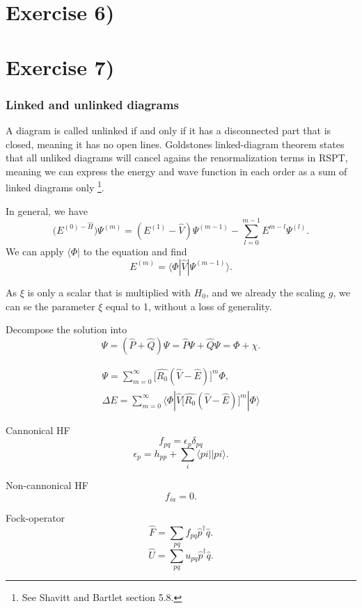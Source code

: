 \documentclass[a4paper, 11pt, notitlepage, english]{article}
\newcommand{\bra}[1]{\langle #1|}
\newcommand{\brakket}[2]{\langle #1 || #2 \rangle}
\newcommand{\op}[1]{\hat{#1}}
\newcommand{\braopket}[3]{\langle #1 | {#2} | #3 \rangle}
\newcommand{\eps}{\epsilon}
\begin{document}
\clearpage

\section*{Exercise 6)}


\clearpage


\section*{Exercise 7)}

\subsubsection*{Linked and unlinked diagrams}

A diagram is called unlinked if and only if it has a disconnected part that is closed, meaning it has no open lines. Goldstones linked-diagram theorem states that all unliked diagrams will cancel agains the renormalization terms in RSPT, meaning we can express the energy and wave function in each order as a sum of linked diagrams only \footnote{See Shavitt and Bartlet section 5.8.}. 

\clearpage

In general, we have
$$\big(E^{(0) - \op{H}}\big) \Psi^{(m)} = (E^{(1)}-\op{V})\Psi^{(m-1)} - \sum_{l=0}^{m-1} E^{m-l}\Psi^{(l)}.$$
We can apply $\bra{\Phi}$ to the equation and find
$$E^{(m)} = \braopket{\Phi}{\op{V}}{\Psi^{(m-1)}}.$$

As $\xi$ is only a scalar that is multiplied with $H_0$, and we already the scaling $g$, we can se the parameter $\xi$ equal to 1, without a loss of generality.

Decompose the solution into
$$\Psi = (\op{P} + \op{Q})\Psi = \op{P}\Psi + \op{Q}\Psi = \Phi + \chi.$$

\begin{align*}
\Psi = \sum_{m=0}^\infty \big[\op{R_0}(\op{V}-\op{E}) \big]^m \Phi, \\
\Delta E = \sum_{m=0}^\infty \braopket{\Phi}{\op{V}\big[\op{R_0}(\op{V}-\op{E}) \big]^m}{\Phi}
\end{align*}


Cannonical HF
$$f_{pq} = \eps_p \delta_{pq}$$
$$\eps_p = h_{pp} + \sum_{i} \brakket{pi}{pi}.$$

Non-cannonical HF
$$f_{ia} = 0.$$

Fock-operator
$$\op{F} = \sum_{pq} f_{pq}\op{p}^\dagger \op{q}.$$
$$\op{U} = \sum_{pq} u_{pq}\op{p}^\dagger \op{q}.$$
\end{document}
